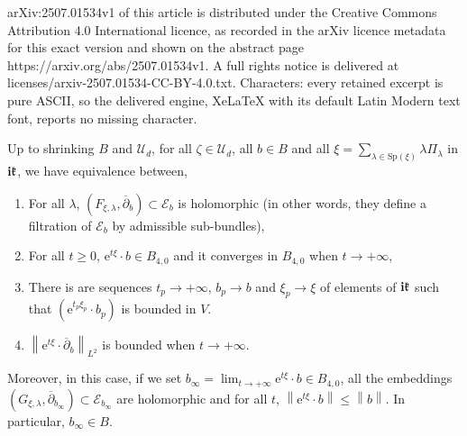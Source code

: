 \documentclass[10pt,a4paper]{amsart}
\newcommand{\E}{\mathcal{E}}
\newcommand{\dbar}{\overline{\partial}}
\newcommand{\e}{\boldsymbol{\mathrm{e}}}
\newcommand{\mU}{\mathcal{U}}
\newcommand{\norme}[1]{\left\| #1 \right\|}
\renewcommand{\geq}{\geqslant}
\renewcommand{\i}{\boldsymbol{\mathrm{i}}}
\renewcommand{\leq}{\leqslant}
\begin{document}
arXiv:2507.01534v1 of this article is distributed under the Creative Commons Attribution 4.0 International licence, as recorded in the arXiv licence metadata for this exact version and shown on the abstract page https://arxiv.org/abs/2507.01534v1. A full rights notice is delivered at licenses/arxiv-2507.01534-CC-BY-4.0.txt. Characters: every retained excerpt is pure ASCII, so the delivered engine, XeLaTeX with its default Latin Modern text font, reports no missing character.
\begin{proposition}\label{PRO:Convergence exp(txi)b}
    Up to shrinking $B$ and $\mU_d$, for all $\zeta \in \mU_d$, all $b \in B$ and all $\xi = \sum_{\lambda \in \mathrm{Sp}(\xi)} \lambda\Pi_\lambda$ in $\i\frak{k}$, we have equivalence between,
    \begin{enumerate}
        \item For all $\lambda$, $(F_{\xi,\lambda},\dbar_b) \subset \E_b$ is holomorphic (in other words, they define a filtration of $\E_b$ by admissible sub-bundles),
        \item For all $t \geq 0$, $\e^{t\xi} \cdot b \in B_{4,0}$ and it converges in $B_{4,0}$ when $t \rightarrow +\infty$,
        \item There is are sequences $t_p \rightarrow +\infty$, $b_p \rightarrow b$ and $\xi_p \rightarrow \xi$ of elements of $\i\frak{k}$ such that $(\e^{t_p\xi_p} \cdot b_p)$ is bounded in $V$.
        \item $\norme{\e^{t\xi} \cdot \dbar_b}_{L^2}$ is bounded when $t \rightarrow +\infty$.
    \end{enumerate}
    Moreover, in this case, if we set $b_\infty = \lim_{t \rightarrow +\infty} \e^{t\xi} \cdot b \in B_{4,0}$, all the embeddings $(G_{\xi,\lambda},\dbar_{b_\infty}) \subset \E_{b_\infty}$ are holomorphic and for all $t$, $\norme{\e^{t\xi} \cdot b} \leq \norme{b}$. In particular, $b_\infty \in B$.
\end{proposition}
\end{document}
